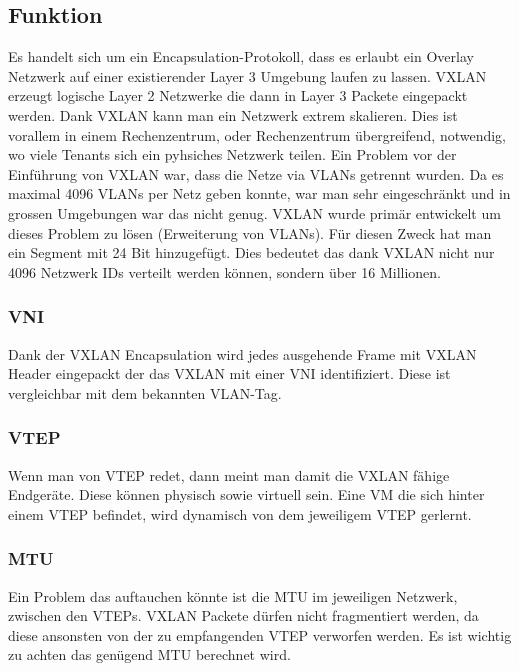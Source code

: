 \documentclass[a4,12pt]{scrartcl}
\begin{document}
\subsection{Funktion}
Es handelt sich um ein Encapsulation-Protokoll, dass es erlaubt ein Overlay Netzwerk auf einer existierender Layer 3 Umgebung laufen zu lassen. VXLAN erzeugt logische Layer 2 Netzwerke die dann in Layer 3 Packete eingepackt werden. Dank VXLAN kann man ein Netzwerk extrem skalieren. Dies ist vorallem in einem Rechenzentrum, oder Rechenzentrum übergreifend, notwendig, wo viele Tenants sich ein pyhsiches Netzwerk teilen. Ein Problem vor der Einführung von VXLAN war, dass die Netze via VLANs getrennt wurden. Da es maximal 4096 VLANs per Netz geben konnte, war man sehr eingeschränkt und in grossen Umgebungen war das nicht genug. VXLAN wurde primär entwickelt um dieses Problem zu lösen (Erweiterung von VLANs). Für diesen Zweck hat man ein Segment mit 24 Bit hinzugefügt. Dies bedeutet das dank VXLAN nicht nur 4096 Netzwerk IDs verteilt werden können, sondern über 16 Millionen. 

\subsubsection{VNI}
Dank der VXLAN Encapsulation wird jedes ausgehende Frame mit VXLAN Header eingepackt der das VXLAN mit einer VNI identifiziert. Diese ist vergleichbar mit dem bekannten VLAN-Tag. 

\subsubsection{VTEP}
Wenn man von VTEP redet, dann meint man damit die VXLAN fähige Endgeräte. Diese können physisch sowie virtuell sein. Eine VM die sich hinter einem VTEP befindet, wird dynamisch von dem jeweiligem VTEP gerlernt. 

\subsubsection{MTU}
Ein Problem das auftauchen könnte ist die MTU im jeweiligen Netzwerk, zwischen den VTEPs. VXLAN Packete dürfen nicht fragmentiert werden, da diese ansonsten von der zu empfangenden VTEP verworfen werden. Es ist wichtig zu achten das genügend MTU berechnet wird. 
\end{document}

